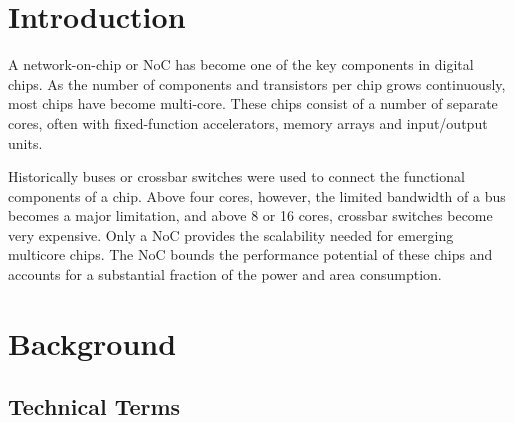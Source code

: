 
\newcommand{\docTitle}{The Spidergon Network-on-Chip}
\newcommand{\docAuthor}{Andrew Fecheyr Lippens}
\newcommand{\docDate}{\today}
\newcommand{\docSubject}{Redes en Chip}







\begin{abstract}
\end{abstract}

\setcounter{tocdepth}{2}
\begin{tableofcontents}
\end{tableofcontents}

\addtolength{\parskip}{0.5\baselineskip}

\newpage

\section{Introduction}\label{C:intro}

A network-on-chip or NoC has become one of the key components in digital chips. 
As the number of components and transistors per chip grows continuously, most chips have become multi-core. 
These chips consist of a number of separate cores, often with fixed-function accelerators, memory arrays and input/output units.
		
Historically buses or crossbar switches were used to connect the functional components of a chip. 
Above four cores, however, the limited bandwidth of a bus becomes a major limitation, and above 8 or 16 cores, crossbar switches become very expensive. 
Only a NoC provides the scalability needed for emerging multicore chips. 
The NoC bounds the performance potential of these chips and accounts for a substantial fraction of the power and area consumption.


\section{Background}\label{C:background}

\subsection{Technical Terms}\label{S:terms}
	
